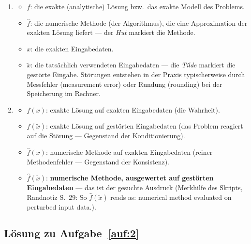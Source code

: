 \documentclass[a4paper,11pt]{scrartcl}
\begin{document}
\begin{enumerate}[label=(\alph*)]
  \item
  \begin{itemize}[nosep]
    \item $f$: die exakte (analytische) Lösung bzw.\ das exakte Modell des Problems.
    \item $\hat{f}$: die numerische Methode (der Algorithmus), die eine Approximation der exakten Lösung liefert --- der \emph{Hut} markiert die Methode.
    \item $x$: die exakten Eingabedaten.
    \item $\tilde{x}$: die tatsächlich verwendeten Eingabedaten --- die \emph{Tilde} markiert die gestörte Eingabe. Störungen entstehen in der Praxis typischerweise durch Messfehler (measurement error) oder Rundung (rounding) bei der Speicherung im Rechner.
  \end{itemize}
  \item
  \begin{itemize}[nosep]
    \item $f(x)$: exakte Lösung auf exakten Eingabedaten (die \glqq Wahrheit\grqq).
    \item $f(\tilde{x})$: exakte Lösung auf gestörten Eingabedaten (das Problem reagiert auf die Störung --- Gegenstand der Konditionierung).
    \item $\hat{f}(x)$: numerische Methode auf exakten Eingabedaten (reiner Methodenfehler --- Gegenstand der Konsistenz).
    \item $\hat{f}(\tilde{x})$: \textbf{numerische Methode, ausgewertet auf gestörten Eingabedaten} --- das ist der gesuchte Ausdruck (Merkhilfe des Skripts, Randnotiz S.~29: \glqq So $\hat{f}(\tilde{x})$ reads as: numerical method evaluated on perturbed input data.\grqq).
  \end{itemize}
\end{enumerate}

\subsection*{Lösung zu Aufgabe~\ref{auf:2}}
\end{document}
